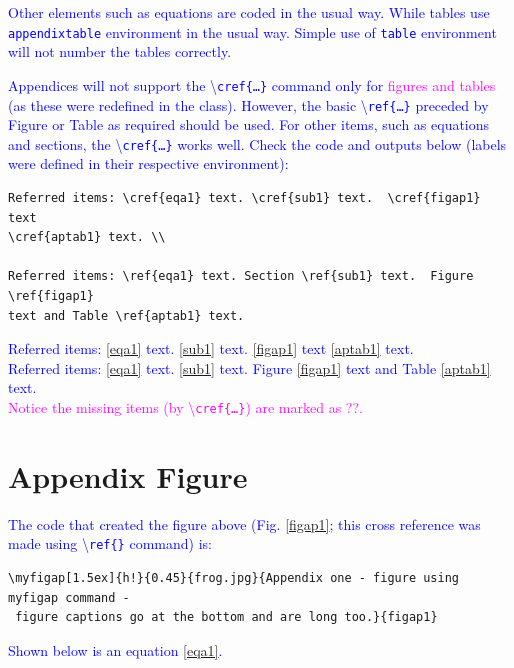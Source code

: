 \documentclass[phd,showframe]{ndsu-thesis-2022}
\newcommand\italk[1]{\textcolor{blue}{#1}}  %
\newcommand\cmd[1]{\textbackslash\texttt{#1}}  %
\begin{document}
\italk{Other elements such as equations are coded in the usual way. While tables use \texttt{appendixtable} environment in the usual way. Simple use of \texttt{table} environment will not number the tables correctly.}

\italk{Appendices will not support the \cmd{cref\{\ldots\}} command only for \textcolor{magenta}{figures and tables} (as these were redefined in the class). However, the basic \cmd{ref\{\ldots\}} preceded by Figure or Table as required should be used. For other items, such as equations and sections, the \cmd{cref\{\ldots\}} works well. Check the code and outputs below (labels were defined in their respective environment):}

{\singlespacing
\begin{verbatim}
Referred items: \cref{eqa1} text. \cref{sub1} text.  \cref{figap1} text 
\cref{aptab1} text. \\

Referred items: \ref{eqa1} text. Section \ref{sub1} text.  Figure \ref{figap1} 
text and Table \ref{aptab1} text.
\end{verbatim}
}

\italk{Referred items: \cref{eqa1} text. \cref{sub1} text.  \cref{figap1} text \cref{aptab1} text. \\
Referred items: \ref{eqa1} text. \ref{sub1} text.  Figure \ref{figap1} text and Table \ref{aptab1} text.
\\ \textcolor{magenta}{Notice the missing items (by \cmd{cref\{\ldots\}}) are marked as ??.}}

\section{Appendix Figure}


\italk{The code that created the figure above (Fig. \ref{figap1}; this cross reference was made using \cmd{ref\{\}} command) is:}

{\onehalfspacing
\begin{verbatim}
\myfigap[1.5ex]{h!}{0.45}{frog.jpg}{Appendix one - figure using myfigap command -
 figure captions go at the bottom and are long too.}{figap1}
\end{verbatim}
}

\italk{Shown below is an equation \cref{eqa1}. } 
\end{document}

